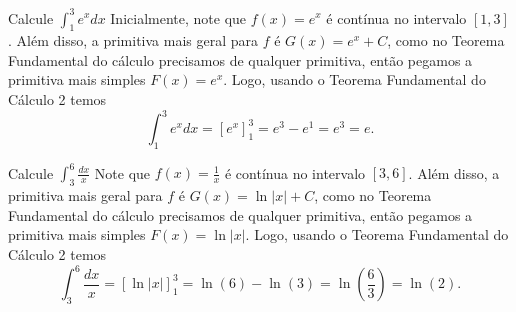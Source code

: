 \begin{example}
  Calcule \(\int_1^3 e^x dx\)
  \solution
  Inicialmente, note que $f(x)=e^x$ é contínua no intervalo $[1,3]$. Além
  disso, a primitiva mais geral para $f$ é $G(x)=e^x+ C$, como no Teorema
  Fundamental do cálculo precisamos de qualquer primitiva, então pegamos a
  primitiva mais simples $F(x)=e^x$. Logo, usando o Teorema Fundamental do
  Cálculo 2 temos
  \[
  \int_1^3 e^x dx= \left[ e^x \right]_1^3= e^3-e^1=e^3=e.
  \]
\end{example}

\begin{example}
  Calcule \(\int_3^6 \frac{dx}{x}\)
  \solution
  Note que $f(x)=\frac{1}{x}$ é contínua no intervalo $[3,6]$. Além disso, a
  primitiva mais geral para $f$ é $G(x)=\ln|x|+ C$, como no Teorema Fundamental
  do cálculo precisamos de qualquer primitiva, então pegamos a primitiva mais
  simples $F(x)=\ln|x|$. Logo, usando o Teorema Fundamental do Cálculo 2 temos
  \[
  \int_3^6 \frac{dx}{x}
  = \left[ \ln|x| \right]_1^3
  = \ln(6)- \ln(3)= \ln(\frac{6}{3})=\ln(2).
  \]
\end{example}

